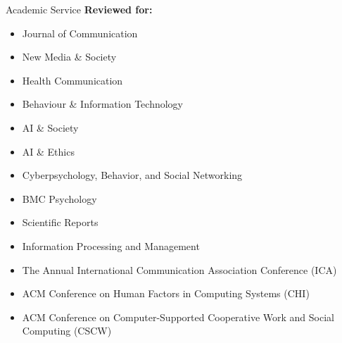\documentclass{resume} %
\begin{document}
\begin{rSection}{Academic Service}
{\bf Reviewed for:} 


\begin{itemize}
 \item Journal of Communication
  \item New Media \& Society
  \item Health Communication
  \item Behaviour \& Information Technology
\item AI \& Society
\item AI \& Ethics
  \item Cyberpsychology, Behavior, and Social Networking
  \item BMC Psychology
  \item Scientific Reports
  \item Information Processing and Management
  \item The Annual International Communication Association Conference (ICA)
  \item ACM Conference on Human Factors in Computing Systems (CHI)
  \item ACM Conference on Computer-Supported Cooperative Work and Social Computing (CSCW)
\end{itemize}


\end{rSection}
\end{document}
